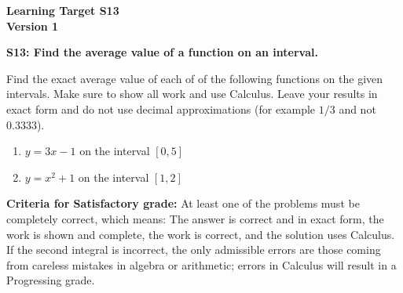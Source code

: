 \documentclass[10pt]{article}
\begin{document}
	\vspace*{0in}

		\begin{center}
			\textbf{Learning Target S13 \\
			Version 1} 
		\end{center}


\begin{framed}
	\textbf{S13: Find the average value of a function on an interval.}
\end{framed}

Find the exact average value of each of of the following functions on the given intervals. Make sure to show all work and use Calculus. Leave your results in exact form and do not use decimal approximations (for example $1/3$ and not $0.3333$). 

\begin{enumerate}
    \item $y = 3x - 1$ on the interval $[0,5]$
    \item $y = x^2 + 1$ on the interval $[1,2]$
\end{enumerate}

\vfill


\begin{small}
    \begin{framed}
        	\textbf{Criteria for Satisfactory grade:} At least one of the problems must be completely correct, which means: The answer is correct and in exact form, the work is shown and complete, the work is correct, and the solution uses Calculus. If the second  integral is incorrect, the only admissible errors are those coming from careless mistakes in algebra or arithmetic; errors in Calculus will result in a Progressing grade. 
    \end{framed}

\end{small}
\end{document}
